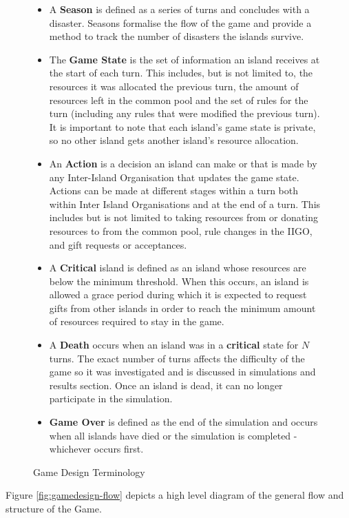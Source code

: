 \begin{figure}[!htb]
\begin{itemize}
\begin{enumerate}
\begin{itemize}
                    \end{itemize}
            \end{enumerate}        
        \item A \textbf{Season} is defined as a series of turns and concludes with a disaster. Seasons formalise the flow of the game and provide a method to track the number of disasters the islands survive.
        \item The \textbf{Game State} is the set of information an island receives at the start of each turn. This includes, but is not limited to, the resources it was allocated the previous turn, the amount of resources left in the common pool and the set of rules for the turn (including any rules that were modified the previous turn). It is important to note that each island's game state is private, so no other island gets another island's resource allocation. 
        \item An \textbf{Action} is a decision an island can make or that is made by any Inter-Island Organisation that updates the game state. Actions can be made at different stages within a turn both within Inter Island Organisations and at the end of a turn. This includes but is not limited to taking resources from or donating resources to from the common pool, rule changes in the IIGO, and gift requests or acceptances. 
        \item A \textbf{Critical} island is defined as an island whose resources are below the minimum threshold. When this occurs, an island is allowed a grace period during which it is expected to request gifts from other islands in order to reach the minimum amount of resources required to stay in the game.
        \item A \textbf{Death} occurs when an island was in a \textbf{critical} state for $N$ turns. The exact number of turns affects the difficulty of the game so it was investigated and is discussed in simulations and results section. Once an island is dead, it can no longer participate in the simulation.
        \item \textbf{Game Over} is defined as the end of the simulation and occurs when all islands have died or the simulation is completed - whichever occurs first.
    \end{itemize}
    \caption{Game Design Terminology}
    \label{fig:gamedesign-terminology}
\end{figure}

Figure \ref{fig:gamedesign-flow} depicts a high level diagram of the general flow and structure of the Game. 

